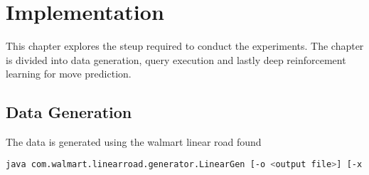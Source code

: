 \chapter{Implementation}
\label{chapter:implementation}
\thispagestyle{myheadings}

\graphicspath{}
This chapter explores the steup required to conduct the experiments. The chapter is divided into data generation, query execution and lastly deep reinforcement learning for move prediction.

\section{Data Generation}
The data is generated using the walmart linear road found \cite{walmart_linearoad}

\begin{lstlisting}[language=bash]
java com.walmart.linearroad.generator.LinearGen [-o <output file>] [-x <number of xways>] [-m <dummy value to activate multi-threading>]
\end{lstlisting}

